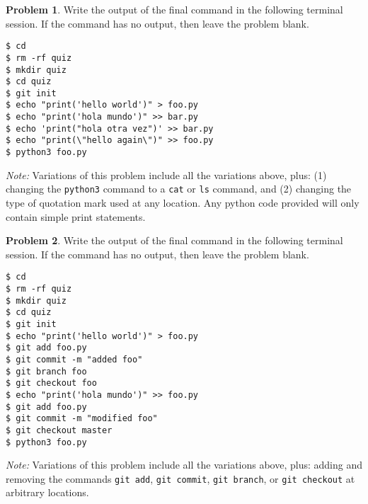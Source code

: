 \documentclass[10pt]{article}
\theoremstyle{definition}
\newtheorem{problem}{Problem}
\begin{document}
\vspace{1in}

\begin{problem}
    Write the output of the final command in the following terminal session.
    If the command has no output, then leave the problem blank.
\end{problem}
\begin{lstlisting}
$ cd
$ rm -rf quiz
$ mkdir quiz
$ cd quiz
$ git init
$ echo "print('hello world')" > foo.py
$ echo "print('hola mundo')" >> bar.py
$ echo 'print("hola otra vez")' >> bar.py
$ echo "print(\"hello again\")" >> foo.py
$ python3 foo.py
\end{lstlisting}
\textit{Note:}
Variations of this problem include all the variations above,
plus:
(1) changing the \lstinline{python3} command to a \lstinline{cat} or \lstinline{ls} command,
and (2) changing the type of quotation mark used at any location.
Any python code provided will only contain simple print statements.
\vspace{2in}

\begin{problem}
    Write the output of the final command in the following terminal session.
    If the command has no output, then leave the problem blank.
\end{problem}
\begin{lstlisting}
$ cd
$ rm -rf quiz
$ mkdir quiz
$ cd quiz
$ git init
$ echo "print('hello world')" > foo.py
$ git add foo.py
$ git commit -m "added foo"
$ git branch foo
$ git checkout foo
$ echo "print('hola mundo')" >> foo.py
$ git add foo.py
$ git commit -m "modified foo"
$ git checkout master
$ python3 foo.py
\end{lstlisting}
\textit{Note:}
Variations of this problem include all the variations above,
plus:
adding and removing the commands \lstinline{git add}, \lstinline{git commit}, \lstinline{git branch}, or \lstinline{git checkout} at arbitrary locations.
\end{document}
